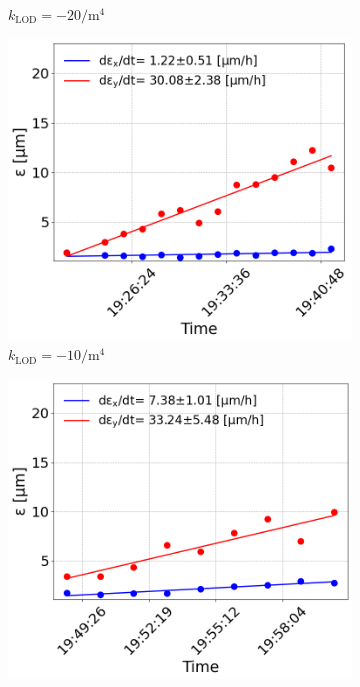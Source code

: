 \begin{figure}[htp]
\begin{subfigure}{.45\textwidth}
        \caption{$k_\mathrm{LOD}=-20 \mathrm{/m^{4}}$}
    \end{subfigure}
    \begin{subfigure}{.45\textwidth}
        \centering
        \includegraphics[width=.95\linewidth]{images/app_c/cc_md_12sep22_coast8.png}  
        \caption{$k_\mathrm{LOD}=-10  \mathrm{/m^{4}}$}
    \end{subfigure}
    \begin{subfigure}{.45\textwidth}
            \centering
            \includegraphics[width=.95\linewidth]{images/app_c/cc_md_12sep22_coast9.png}  

\end{subfigure}
\end{figure}

